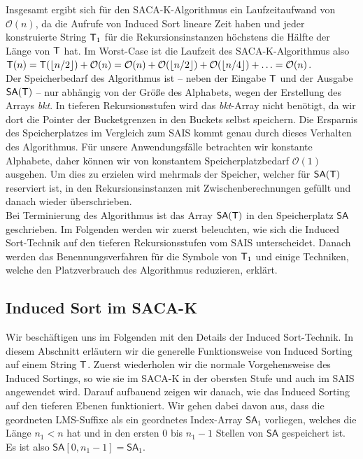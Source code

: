 Insgesamt ergibt sich für den SACA-K-Algorithmus ein Laufzeitaufwand von $\mathcal O(n)$, da die Aufrufe von Induced Sort lineare Zeit haben und jeder konstruierte String $\inputtext_1$ für die Rekursionsinstanzen höchstens die Hälfte der Länge von $\inputtext$ hat. Im Worst-Case ist die Laufzeit des SACA-K-Algorithmus also $\mathcal \inputtext(n) = \mathcal \inputtext(\lfloor n/2 \rfloor) + \mathcal O(n) = \mathcal O(n) + \mathcal O(\lfloor n/2 \rfloor) + \mathcal O(\lfloor n/4 \rfloor) + \ldots = \mathcal O(n)$. \\
Der Speicherbedarf des Algorithmus ist -- neben der Eingabe $\inputtext$ und der Ausgabe $\mathsf{SA}(\inputtext)$ -- nur abhängig von der Größe des Alphabets, wegen der Erstellung des Arrays \textit{bkt}. In tieferen Rekursionsstufen wird das \textit{bkt}-Array nicht benötigt, da wir dort die Pointer der Bucketgrenzen in den Buckets selbst speichern. Die Ersparnis des Speicherplatzes im Vergleich zum SAIS kommt genau durch dieses Verhalten des Algorithmus. Für unsere Anwendungsfälle betrachten wir konstante Alphabete, daher können wir von konstantem Speicherplatzbedarf $\mathcal O(1)$ ausgehen. Um dies zu erzielen wird mehrmals der Speicher, welcher für $\mathsf{SA}(\inputtext)$ reserviert ist, in den Rekursionsinstanzen mit Zwischenberechnungen gefüllt und danach wieder überschrieben.  \\

Bei Terminierung des Algorithmus ist das Array $\mathsf{SA}(\inputtext)$ in den Speicherplatz $\mathsf{SA}$ geschrieben. Im Folgenden werden wir zuerst beleuchten, wie sich die Induced Sort-Technik auf den tieferen Rekursionsstufen vom SAIS unterscheidet. Danach werden das Benennungsverfahren für die Symbole von $\inputtext_1$ und einige Techniken, welche den Platzverbrauch des Algorithmus reduzieren, erklärt.

\subsection{Induced Sort im SACA-K}

Wir beschäftigen uns im Folgenden mit den Details der Induced Sort-Technik. In diesem Abschnitt erläutern wir die generelle Funktionsweise von Induced Sorting auf einem String $\inputtext$. Zuerst wiederholen wir die normale Vorgehensweise des Induced Sortings, so wie sie im SACA-K in der obersten Stufe und auch im SAIS angewendet wird. Darauf aufbauend zeigen wir danach, wie das Induced Sorting auf den tieferen Ebenen funktioniert. Wir gehen dabei davon aus, dass die geordneten LMS-Suffixe als ein geordnetes Index-Array $\mathsf{SA}_1$ vorliegen, welches die Länge $n_1 < n$ hat und in den ersten $0$ bis $n_1-1$ Stellen von $\mathsf{SA}$ gespeichert ist. Es ist also $\mathsf{SA}[0,n_1-1] = \mathsf{SA}_1$. \pagebreak

